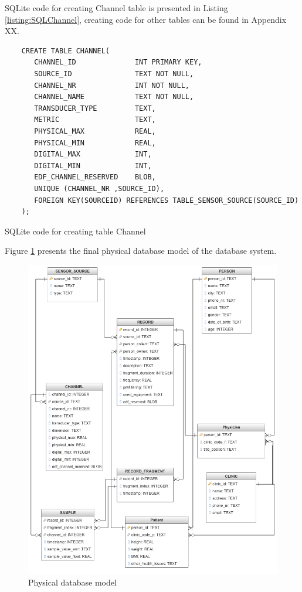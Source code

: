 SQLite code for creating Channel table is presented in Listing \ref{listing:SQLChannel}, creating code for other tables can be found in Appendix XX.
\begin{code}[ht]
\begin{lstlisting}
    CREATE TABLE CHANNEL(
	   CHANNEL_ID              INT PRIMARY KEY,
	   SOURCE_ID               TEXT NOT NULL,
	   CHANNEL_NR              INT NOT NULL,
	   CHANNEL_NAME            TEXT NOT NULL,
	   TRANSDUCER_TYPE         TEXT,
	   METRIC                  TEXT,
	   PHYSICAL_MAX            REAL,
	   PHYSICAL_MIN            REAL,
	   DIGITAL_MAX             INT,
	   DIGITAL_MIN             INT,
	   EDF_CHANNEL_RESERVED    BLOB,
	   UNIQUE (CHANNEL_NR ,SOURCE_ID),
       FOREIGN KEY(SOURCEID) REFERENCES TABLE_SENSOR_SOURCE(SOURCE_ID)
	);
\end{lstlisting}
\caption[SQLite code for creating table Channel]{SQLite code for creating table Channel}
\label{listing:SQLChannel}
\end{code}
Figure \ref{fig:Figures/FinalTable} presents the final physical database model of the database system.
\begin{figure}[ht]
    \centering
    \includegraphics[width=1.0\textwidth]{Figures/FinalTable.png}
    \caption{Physical database model}
    \label{fig:Figures/FinalTable}
\end{figure}






